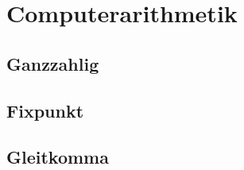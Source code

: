 \section{Computerarithmetik}

\subsection{Ganzzahlig}

\subsection{Fixpunkt}

\subsection{Gleitkomma}

